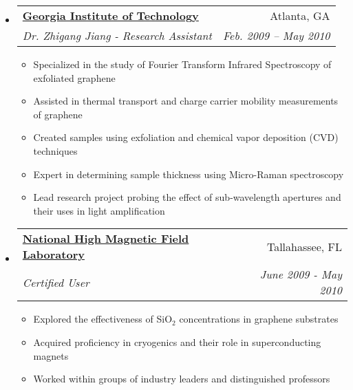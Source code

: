 \documentclass[letterpaper,11pt]{article}
\makeatletter
\newcommand{\resitem}[1]{\item #1 \vspace{-2pt}}
\newcommand{\ressubheading}[4]{
\begin{tabular*}{6.5in}{l@{\extracolsep{\fill}}r}
		\textbf{#1} & #2 \\
		\textit{#3} & \textit{#4} \\
\end{tabular*}\vspace{-6pt}}
\makeatother
\begin{document}
\begin{itemize}
  \item
    \ressubheading{\href{http://phweb.physics.gatech.edu/research/jiang/members.html}{Georgia Institute of Technology}}{Atlanta, GA}{Dr. Zhigang Jiang - Research Assistant}{Feb. 2009 -- May 2010}
    { \footnotesize
    \begin{itemize}
        \resitem{Specialized in the study of Fourier Transform Infrared Spectroscopy of exfoliated graphene}
        \resitem{Assisted in thermal transport and charge carrier mobility measurements of graphene}
        \resitem{Created samples using exfoliation and chemical vapor deposition (CVD) techniques}
        \resitem{Expert in determining sample thickness using Micro-Raman spectroscopy}
        \resitem{Lead research project probing the effect of sub-wavelength apertures and their uses in light amplification}
    \end{itemize}
    }
  \item
    \ressubheading{\href{http://www.magnet.fsu.edu/}{National High Magnetic Field Laboratory}}{Tallahassee, FL}{Certified User}{June 2009 - May 2010}
    { \footnotesize
    \begin{itemize}
        \resitem{Explored the effectiveness of SiO$_{2}$ concentrations in graphene substrates}
        \resitem{Acquired proficiency in cryogenics and their role in superconducting magnets}
        \resitem{Worked within groups of industry leaders and distinguished professors}
    \end{itemize}
    }
\end{itemize}
\end{document}
